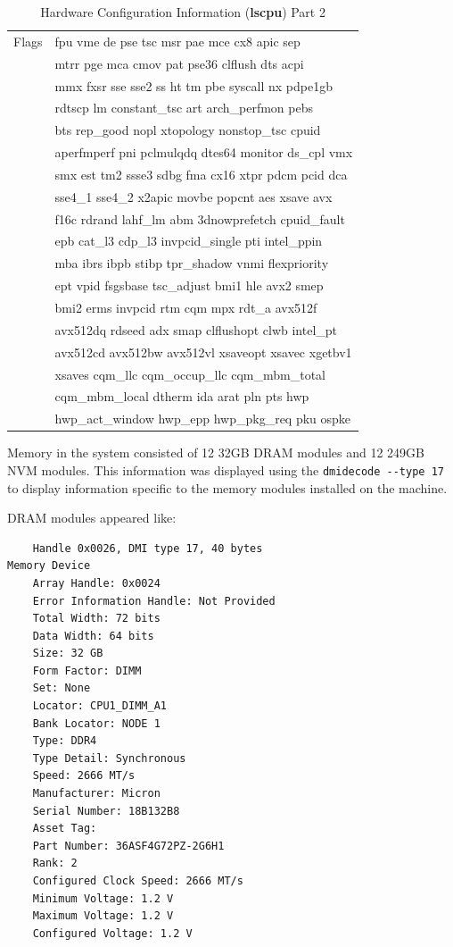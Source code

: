 \begin{table}
        \caption{Hardware Configuration Information (\textbf{lscpu}) Part 2}\label{table:results:hardware:2}
        \begin{tabular}{@{}cl@{}}
        Flags & fpu vme de pse tsc msr pae mce cx8 apic sep \\
        & mtrr pge mca cmov pat pse36 clflush dts acpi \\
        & mmx fxsr sse sse2 ss ht tm pbe syscall nx pdpe1gb \\
        & rdtscp lm constant\_tsc art arch\_perfmon pebs \\
        & bts rep\_good nopl xtopology nonstop\_tsc cpuid \\
        & aperfmperf pni pclmulqdq dtes64 monitor ds\_cpl vmx \\
        & smx est tm2 ssse3 sdbg fma cx16 xtpr pdcm pcid dca \\
        & sse4\_1 sse4\_2 x2apic movbe popcnt aes xsave avx \\
        & f16c rdrand lahf\_lm abm 3dnowprefetch cpuid\_fault \\
        & epb cat\_l3 cdp\_l3 invpcid\_single pti intel\_ppin \\
        & mba ibrs ibpb stibp tpr\_shadow vnmi flexpriority \\
        & ept vpid fsgsbase tsc\_adjust bmi1 hle avx2 smep \\
        & bmi2 erms invpcid rtm cqm mpx rdt\_a avx512f \\ 
        & avx512dq rdseed adx smap clflushopt clwb intel\_pt \\
        & avx512cd avx512bw avx512vl xsaveopt xsavec xgetbv1 \\
        & xsaves cqm\_llc cqm\_occup\_llc cqm\_mbm\_total \\
        & cqm\_mbm\_local dtherm ida arat pln pts hwp \\
        & hwp\_act\_window hwp\_epp hwp\_pkg\_req pku ospke \\
        \bottomrule
    \end{tabular}%
\end{table}

Memory in the system consisted of 12 32GB DRAM modules and 12 249GB NVM modules.  This information
was displayed using the \verb+dmidecode --type 17+ to display information specific to the memory
modules installed on the machine.

DRAM modules appeared like:

\begin{verbatim}
    Handle 0x0026, DMI type 17, 40 bytes
Memory Device
	Array Handle: 0x0024
	Error Information Handle: Not Provided
	Total Width: 72 bits
	Data Width: 64 bits
	Size: 32 GB
	Form Factor: DIMM
	Set: None
	Locator: CPU1_DIMM_A1
	Bank Locator: NODE 1
	Type: DDR4
	Type Detail: Synchronous
	Speed: 2666 MT/s
	Manufacturer: Micron
	Serial Number: 18B132B8
	Asset Tag:  
	Part Number: 36ASF4G72PZ-2G6H1   
	Rank: 2
	Configured Clock Speed: 2666 MT/s
	Minimum Voltage: 1.2 V
	Maximum Voltage: 1.2 V
	Configured Voltage: 1.2 V
\end{verbatim}

